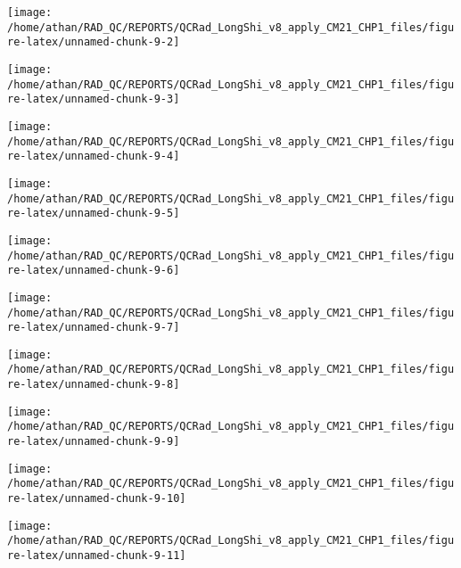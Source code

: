 \documentclass[
  10pt,
  a4paper,oneside]{article}
\begin{document}
\begin{center}\texttt{[image: /home/athan/RAD\_QC/REPORTS/QCRad\_LongShi\_v8\_apply\_CM21\_CHP1\_files/figure-latex/unnamed-chunk-9-2]} \end{center}

\begin{center}\texttt{[image: /home/athan/RAD\_QC/REPORTS/QCRad\_LongShi\_v8\_apply\_CM21\_CHP1\_files/figure-latex/unnamed-chunk-9-3]} \end{center}

\begin{center}\texttt{[image: /home/athan/RAD\_QC/REPORTS/QCRad\_LongShi\_v8\_apply\_CM21\_CHP1\_files/figure-latex/unnamed-chunk-9-4]} \end{center}

\begin{center}\texttt{[image: /home/athan/RAD\_QC/REPORTS/QCRad\_LongShi\_v8\_apply\_CM21\_CHP1\_files/figure-latex/unnamed-chunk-9-5]} \end{center}

\begin{center}\texttt{[image: /home/athan/RAD\_QC/REPORTS/QCRad\_LongShi\_v8\_apply\_CM21\_CHP1\_files/figure-latex/unnamed-chunk-9-6]} \end{center}

\begin{center}\texttt{[image: /home/athan/RAD\_QC/REPORTS/QCRad\_LongShi\_v8\_apply\_CM21\_CHP1\_files/figure-latex/unnamed-chunk-9-7]} \end{center}

\begin{center}\texttt{[image: /home/athan/RAD\_QC/REPORTS/QCRad\_LongShi\_v8\_apply\_CM21\_CHP1\_files/figure-latex/unnamed-chunk-9-8]} \end{center}

\begin{center}\texttt{[image: /home/athan/RAD\_QC/REPORTS/QCRad\_LongShi\_v8\_apply\_CM21\_CHP1\_files/figure-latex/unnamed-chunk-9-9]} \end{center}

\begin{center}\texttt{[image: /home/athan/RAD\_QC/REPORTS/QCRad\_LongShi\_v8\_apply\_CM21\_CHP1\_files/figure-latex/unnamed-chunk-9-10]} \end{center}

\begin{center}\texttt{[image: /home/athan/RAD\_QC/REPORTS/QCRad\_LongShi\_v8\_apply\_CM21\_CHP1\_files/figure-latex/unnamed-chunk-9-11]} \end{center}
\end{document}
